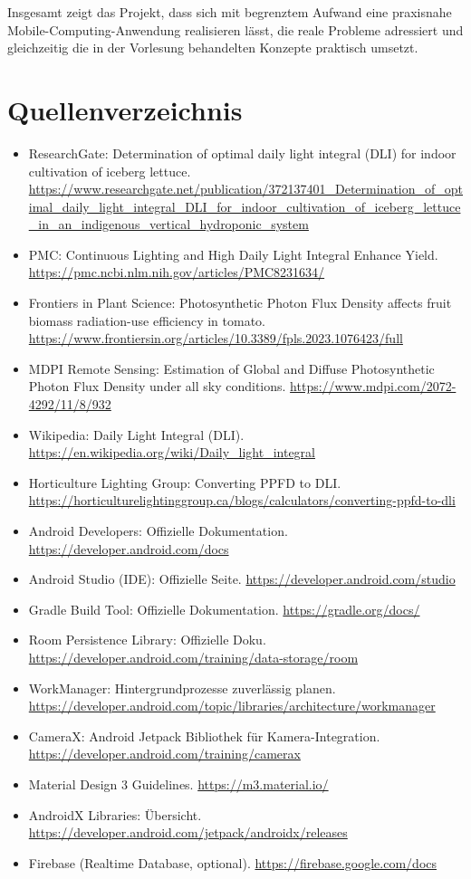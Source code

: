 \documentclass[14pt,a4paper]{report}
\begin{document}
Insgesamt zeigt das Projekt, dass sich mit begrenztem Aufwand eine praxisnahe Mobile-Computing-Anwendung realisieren lässt, die reale Probleme adressiert und gleichzeitig die in der Vorlesung behandelten Konzepte praktisch umsetzt.

\chapter{Quellenverzeichnis}

\begin{itemize}
    \item ResearchGate: Determination of optimal daily light integral (DLI) for indoor cultivation of iceberg lettuce. \url{https://www.researchgate.net/publication/372137401_Determination_of_optimal_daily_light_integral_DLI_for_indoor_cultivation_of_iceberg_lettuce_in_an_indigenous_vertical_hydroponic_system}
    \item PMC: Continuous Lighting and High Daily Light Integral Enhance Yield. \url{https://pmc.ncbi.nlm.nih.gov/articles/PMC8231634/}
    \item Frontiers in Plant Science: Photosynthetic Photon Flux Density affects fruit biomass radiation-use efficiency in tomato. \url{https://www.frontiersin.org/articles/10.3389/fpls.2023.1076423/full}
    \item MDPI Remote Sensing: Estimation of Global and Diffuse Photosynthetic Photon Flux Density under all sky conditions. \url{https://www.mdpi.com/2072-4292/11/8/932}
    \item Wikipedia: Daily Light Integral (DLI). \url{https://en.wikipedia.org/wiki/Daily_light_integral}
    \item Horticulture Lighting Group: Converting PPFD to DLI. \url{https://horticulturelightinggroup.ca/blogs/calculators/converting-ppfd-to-dli}

    \item Android Developers: Offizielle Dokumentation. \url{https://developer.android.com/docs}
    \item Android Studio (IDE): Offizielle Seite. \url{https://developer.android.com/studio}
    \item Gradle Build Tool: Offizielle Dokumentation. \url{https://gradle.org/docs/}
    \item Room Persistence Library: Offizielle Doku. \url{https://developer.android.com/training/data-storage/room}
    \item WorkManager: Hintergrundprozesse zuverlässig planen. \url{https://developer.android.com/topic/libraries/architecture/workmanager}
    \item CameraX: Android Jetpack Bibliothek für Kamera-Integration. \url{https://developer.android.com/training/camerax}
    \item Material Design 3 Guidelines. \url{https://m3.material.io/}
    \item AndroidX Libraries: Übersicht. \url{https://developer.android.com/jetpack/androidx/releases}
    \item Firebase (Realtime Database, optional). \url{https://firebase.google.com/docs}
    

\end{itemize}
\end{document}

